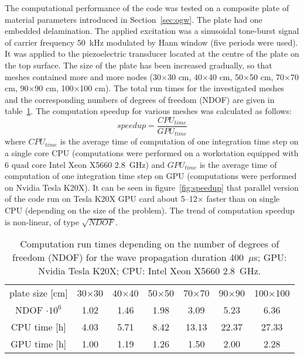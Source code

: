 \documentclass[12pt]{iopart}
\begin{document}
The computational performance of the code was tested on a composite plate of material parameters introduced in Section~\ref{sec:ogw}. The plate had one embedded delamination. The applied excitation was a sinusoidal tone-burst signal of carrier frequency 50~kHz modulated by Hann window (five periods were used). It was applied to the piezoelectric transducer located at the centre of the plate on the top surface. The size of the plate has been increased gradually, so that meshes contained more and more nodes (30$\times$30 cm, 40$\times$40 cm, 50$\times$50 cm, 70$\times$70 cm, 90$\times$90 cm, 100$\times$100 cm). The total run times for the investigated meshes and the corresponding numbers of degrees of freedom (NDOF) are given in table~\ref{tab:run_time}. The computation speedup for various meshes was calculated as follows:
\begin{equation}
speedup = \frac{CPU_{time}}{GPU_{time}}
\label{eq:speedup}
\end{equation}
where $CPU_{time}$ is the average time of computation of one integration time step on a single core CPU (computations were performed on a workstation equipped with 6 quad core Intel
Xeon X5660 2.8~GHz) and $GPU_{time}$ is the average time of computation of one integration time step on
GPU (computations were performed on Nvidia Tesla K20X). It can be seen in figure~\ref{fig:speedup} that parallel version of the code run on Tesla K20X GPU card about 5--12$\times$ faster than on single CPU (depending on the size of the problem). The trend of computation speedup is non-linear, of type $\sqrt{NDOF}$. 

\begin{table}
		\caption{Computation run times depending on the number of degrees of freedom (NDOF) for the wave propagation duration 400~$\mu$s; GPU: Nvidia Tesla K20X; CPU: Intel Xeon X5660 2.8~GHz.}
	\begin{indented}
	\item[]	\begin{tabular}{ccccccc} 
		\toprule	
		plate size [cm] & 30$\times$30  & 40$\times$40 & 50$\times$50 & 70$\times$70 & 90$\times$90 & 100$\times$100 \\
		NDOF $\cdot 10^6$ & 1.02  & 1.46 & 1.98 & 3.09 & 5.23 & 6.36 \\
		\midrule
		CPU time [h]& 4.03& 5.71 & 8.42 & 13.13 & 22.37 & 27.33\\
		\midrule
		GPU time [h]& 1.00& 1.19 & 1.26 & 1.50 & 2.00 & 2.28\\
		\bottomrule 
	\end{tabular} 
\end{indented}
	\label{tab:run_time}
\end{table}
\end{document}
